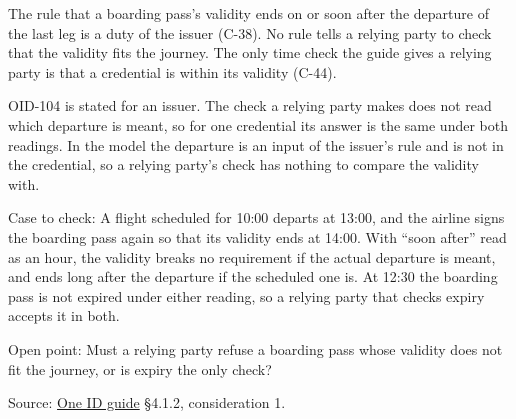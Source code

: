 \begin{definition}
  \label{def:c109}
  \notready
  The rule that a boarding pass's validity ends on or soon after the
  departure of the last leg is a duty of the issuer (C-38). No rule tells a
  relying party to check that the validity fits the journey. The only time
  check the guide gives a relying party is that a credential is within its
  validity (C-44).

  OID-104 is stated for an issuer. The check a relying party makes does not
  read which departure is meant, so for one credential its answer is the same
  under both readings. In the model the departure is an input of the issuer's
  rule and is not in the credential, so a relying party's check has nothing
  to compare the validity with.

  Case to check: A flight scheduled for 10:00 departs at 13:00, and the
  airline signs the boarding pass again so that its validity ends at 14:00.
  With ``soon after'' read as an hour, the validity breaks no requirement if
  the actual departure is meant, and ends long after the departure if the
  scheduled one is. At 12:30 the boarding pass is not expired under either
  reading, so a relying party that checks expiry accepts it in both.

  Open point: Must a relying party refuse a boarding pass whose validity does
  not fit the journey, or is expiry the only check?

  Source:
  \href{https://standards.atlassian.net/wiki/spaces/OneID/pages/2947416082/Technical+Implementation+Guide}{One
  ID guide} §4.1.2, consideration 1.
\end{definition}
